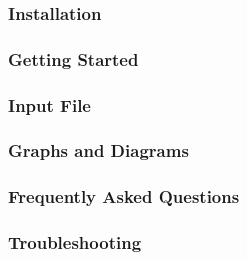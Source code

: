 \subsubsection*{Installation}

\subsubsection*{Getting Started}

\subsubsection*{Input File}

\subsubsection*{Graphs and Diagrams}

\subsubsection*{Frequently Asked Questions}

\subsubsection*{Troubleshooting}